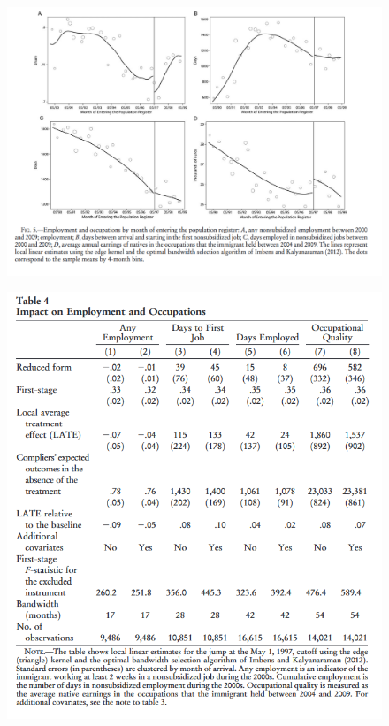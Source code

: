 \documentclass[../root]{subfiles}
\begin{document}
    
    
    \begin{figure}[h]
        \includegraphics[width=12cm]{0703sugiyama/Figure5.png}
    \end{figure}
    
    \begin{figure}[h]
        \includegraphics[width=12cm]{0703sugiyama/Table4.png}
    \end{figure}
    
\end{document}
